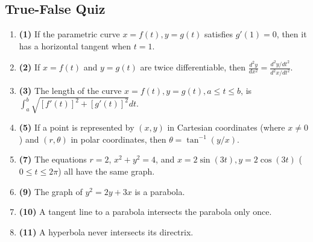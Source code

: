 \documentclass[12pt, a4paper]{article}
\begin{document}
\hrulefill
\vspace{1em}

\subsection*{True-False Quiz}
\begin{enumerate}
    \item \textbf{(1)} If the parametric curve $x = f(t), y = g(t)$ satisfies $g'(1) = 0$, then it has a horizontal tangent when $t = 1$.
    \item \textbf{(2)} If $x = f(t)$ and $y = g(t)$ are twice differentiable, then $\frac{d^2y}{dx^2} = \frac{d^2y/dt^2}{d^2x/dt^2}$.
    \item \textbf{(3)} The length of the curve $x = f(t), y = g(t), a \le t \le b$, is $\int_a^b \sqrt{[f'(t)]^2 + [g'(t)]^2} dt$.
    \item \textbf{(5)} If a point is represented by $(x, y)$ in Cartesian coordinates (where $x \ne 0$) and $(r, \theta)$ in polar coordinates, then $\theta = \tan^{-1}(y/x)$.
    \item \textbf{(7)} The equations $r=2$, $x^2+y^2=4$, and $x = 2\sin(3t), y=2\cos(3t)$ ($0 \le t \le 2\pi$) all have the same graph.
    \item \textbf{(9)} The graph of $y^2 = 2y + 3x$ is a parabola.
    \item \textbf{(10)} A tangent line to a parabola intersects the parabola only once.
    \item \textbf{(11)} A hyperbola never intersects its directrix.
\end{enumerate}

\hrulefill
\vspace{1em}
\end{document}
